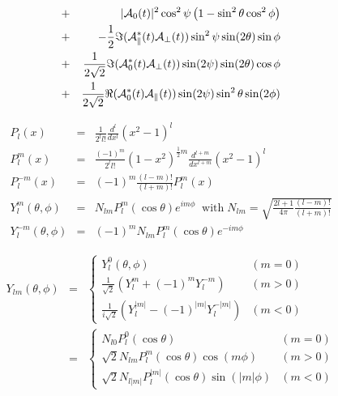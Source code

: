 \documentclass[a4paper,9pt,twoside]{article}
\begin{document}
\begin{eqnarray}
                              &+&   |{\cal A}_0(t)|^2 \cos^2\psi\left( 1  -  \sin^2\theta\cos^2\phi\right) \\
                              &+&     -\frac{1}{2}\Im({\cal A}_\parallel^*(t){\cal A}_\perp(t))\sin^2\psi\sin(2\theta)\sin\phi  \\
                              &+&     \frac{1}{2\sqrt{2}}\Im({\cal A}_0^*(t) {\cal A}_\perp(t) ) \sin(2\psi)\sin(2\theta)\cos\phi \\
                              &+&     \frac{1}{2\sqrt{2}}\Re({\cal A}_0^*(t) {\cal A}_\parallel(t))\sin(2\psi)\sin^2\theta\sin(2\phi)\\
\end{eqnarray}


\begin{eqnarray}
P_l(x) &=& \frac{1}{2^l l!} \frac{d^l}{dx^l}(x^2-1)^l \\
P_l^m(x) &=& \frac{(-1)^m}{2^l l!} (1-x^2)^{\frac{1}{2}m} \frac{d^{l+m}}{dx^{l+m}} (x^2-1)^l\\
P_l^{-m}(x) & = & (-1)^m \frac{(l-m)!}{(l+m)!}P_l^m(x) \\
Y_l^m (\theta,\phi) &=& N_{lm} P_l^m(\cos\theta)e^{im\phi}\;\;\mathrm{with}\;N_{lm} =\sqrt{ \frac{2l+1}{4\pi}\frac{(l-m)!}{(l+m)!} } \\
Y_l^{-m}(\theta,\phi) &=& (-1)^m N_{lm}P_l^m(\cos\theta) e^{-im\phi}
\end{eqnarray}

\begin{eqnarray}
Y_{lm}(\theta,\phi) & = & \left\{ \begin{array}{cl} 
                                             Y_l^0(\theta,\phi) & (m=0) \\
                                             \frac{1}{\sqrt{2}} \left( Y_l^m + (-1)^m Y_l^{-m}\right)  & (m>0) \\
                                             \frac{1}{i\sqrt{2}}\left( Y_l^{|m|}-(-1)^{|m|}Y_l^{-|m|} \right) & (m<0)
                                  \end{array}\right.\\
                    & = & \left\{ \begin{array}{cl} 
                                             N_{l0} P_l^0(\cos\theta) & (m=0) \\
                                             \sqrt{2}N_{lm}P_l^m(\cos\theta)\cos(m\phi) & (m>0) \\
                                             \sqrt{2}N_{l|m|} P_l^{|m|}(\cos\theta)\sin(|m|\phi)& (m<0)
                                  \end{array}\right.
\end{eqnarray}
\end{document}
